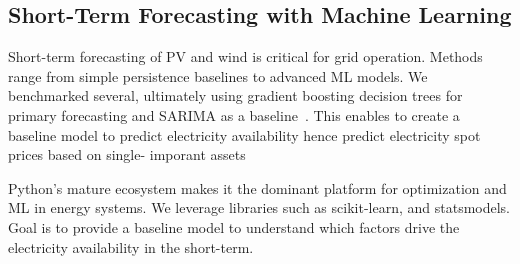 \subsection{Short-Term Forecasting with Machine Learning}
Short-term forecasting of PV and wind is critical for grid operation. Methods range from simple persistence 
baselines to advanced ML models. We benchmarked several, ultimately using gradient boosting decision trees for primary 
forecasting and SARIMA as a baseline~\cite{grzebyk2021xgboost, zhong2020xgboost}. This enables to create a baseline 
model to predict electricity availability hence predict electricity spot prices based on single- imporant assets

Python’s mature ecosystem makes it the dominant platform for optimization and ML in energy systems. We leverage 
libraries such as scikit-learn, and statsmodels. Goal is to provide a baseline model to understand which factors drive
the electricity availability in the short-term.




